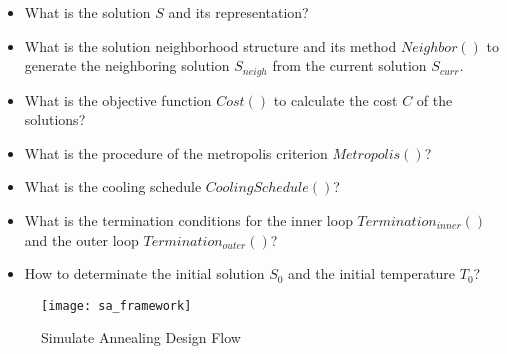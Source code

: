 	\begin{itemize}
		\item What is the solution $S$ and its representation?
		\item What is the solution neighborhood structure and its method $Neighbor()$ to
		generate the neighboring solution $S_{neigh}$ from the current solution $S_{curr}$.
		\item What is the objective function $Cost()$ to calculate the cost $C$ of the solutions?
		\item What is the procedure of the metropolis criterion $Metropolis()$?
		\item What is the cooling schedule $CoolingSchedule()$?
		\item What is the termination conditions for the inner loop $Termination_{inner}()$ and
		the outer loop $Termination_{outer}()$?
		\item How to determinate the initial solution $S_{0}$ and the initial temperature $T_{0}$?
	\end{itemize}

	\begin{figure}[htb]
		\begin{center}
			\texttt{[image: sa\_framework]}
			\caption{Simulate Annealing Design Flow}
			\label{fig:sa_framwork}
		\end{center}
	\end{figure}

